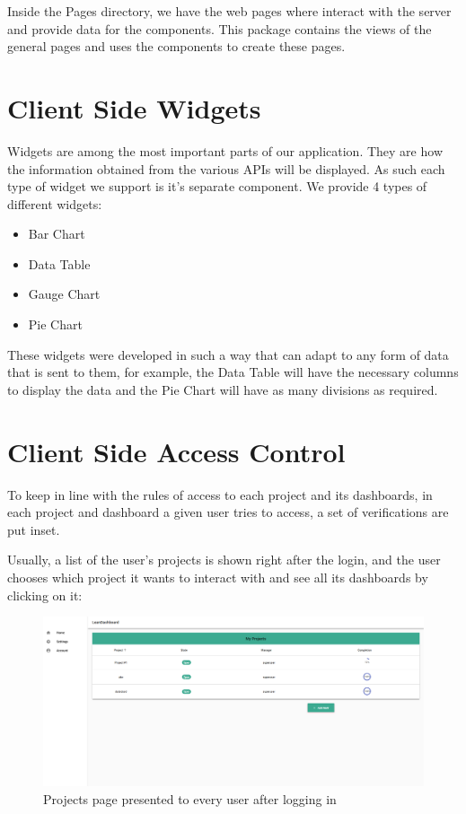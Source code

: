 \documentclass[a4paper,twoside,10pt]{report}
\begin{document}
Inside the Pages directory, we have the web pages where interact with the server and provide data for the components. This package contains the views of the general pages and uses the components to create these pages. 
\newpage

\section{Client Side Widgets}

Widgets are among the most important parts of our application. They are how the information obtained from the various APIs will be displayed.
\newline
As such each type of widget we support is it's separate component. 
\newline
We provide 4 types of different widgets:
 \begin{itemize}
	\item Bar Chart
	\item Data Table
	\item Gauge Chart
	\item Pie Chart
\end{itemize}
These widgets were developed in such a way that can adapt to any form of data that is sent to them, for example, the Data Table will have the necessary columns to display the data and the Pie Chart will have as many divisions as required.

\section{Client Side Access Control}
To keep in line with the rules of access to each project and its dashboards, in each project and dashboard a given user tries to access, a set of verifications are put inset.

Usually, a list of the user's projects is shown right after the login, and the user chooses which project it wants to interact with and see all its dashboards by clicking on it:
\begin{figure}[h!]
\center
    \includegraphics[width=\textwidth]{projectsPage.png}
\caption{Projects page presented to every user after logging in}
\end{figure}
\end{document}

